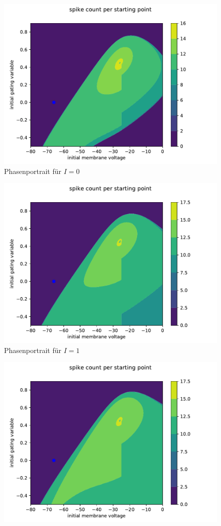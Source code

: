 \documentclass[12pt,a4paper]{article}
\begin{document}
\begin{figure}[H]
	\centering
	\includegraphics[scale=0.9]{contourneu0neu.pdf} 
	\caption{Phasenportrait für $I=0$}
	\label{pp0}
\end{figure}\begin{figure}[H]
\centering
\includegraphics[scale=0.9]{contourneu1neu.pdf} 
\caption{Phasenportrait für $I=1$}
\label{pp1}
\end{figure}\begin{figure}[H]
\centering
\includegraphics[scale=0.9]{contourneu2neu.pdf} 

\end{figure}
\end{document}
